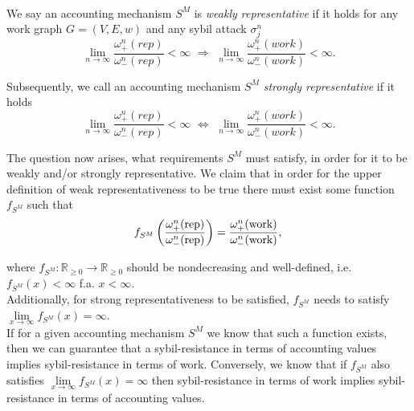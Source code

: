 \begin{definition}[Representative]\ \\
\noindent{}We say an accounting mechanism $S^M$ is {\it weakly representative} if it holds for any work graph $G=(V,E,w)$ and any sybil attack $\sigma_j^n$  \vspace{1em}\\

\[
\lim\limits_{n\rightarrow\infty}\frac{\omega^n_{+}(rep)}{\omega^n_{-}(rep)}<\infty\,\, \Longrightarrow \,\,\lim\limits_{n\rightarrow\infty}\frac{\omega^n_{+}(work)}{\omega^n_{-}(work)}<\infty. 
\]

\noindent{}Subsequently, we call an accounting mechanism $S^M$ {\it strongly representative} if it holds \vspace{1em}\\

\[
\lim\limits_{n\rightarrow\infty}\frac{\omega^n_{+}(rep)}{\omega^n_{-}(rep)}<\infty\,\, \Longleftrightarrow  \,\,\lim\limits_{n\rightarrow\infty}\frac{\omega^n_{+}(work)}{\omega^n_{-}(work)}<\infty.
\]
\end{definition}

\noindent{}The question now arises, what requirements $S^M$ must satisfy, in order for it to be weakly and/or strongly representative. We claim that in order for the upper definition of weak representativeness to be true there must exist some function $f_{S^M}$ such that \vspace{1em}\\

\[
f_{S^M}\left(\frac{\omega^{n}_{+}({\rm rep})}{\omega^{n}_{-}({\rm rep})}\right) = \frac{\omega^{n}_{+}({\rm work})}{\omega^{n}_{-}({\rm work})}, \vspace{1em}\\
\]

\noindent{}where $f_{S^M}:\mathbb{R}_{\geq{}0}\rightarrow\mathbb{R}_{\geq{}0}$ should be nondecreasing and well-defined, i.e. $f_{S^M}(x)<\infty$ f.a. $x<\infty$. \vspace{1em}\\

\noindent{}Additionally, for strong representativeness to be satisfied, $f_{S^M}$ needs to satisfy $\lim\limits_{x\rightarrow\infty}f_{S^M}(x)=\infty$.\vspace{1em}\\

\noindent{}If for a given accounting mechanism $S^M$ we know that such a function exists, then we can guarantee that a sybil-resistance in terms of accounting values implies sybil-resistance in terms of work. Conversely, we know that if $f_{S^M}$ also satisfies $\lim\limits_{x\rightarrow\infty}f_{S^M}(x)=\infty$ then sybil-resistance in terms of work implies sybil-resistance in terms of accounting values. \vspace{1em}\\

